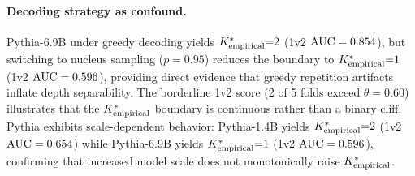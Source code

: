 \paragraph{Decoding strategy as confound.}
Pythia-6.9B under greedy decoding yields ${K^*_{\text{empirical}}}{=}2$ (1v2 $\text{AUC} = 0.854$), but switching to nucleus sampling ($p{=}0.95$) reduces the boundary to ${K^*_{\text{empirical}}}{=}1$ (1v2 $\text{AUC} = 0.596$), providing direct evidence that greedy repetition artifacts inflate depth separability.
The borderline 1v2 score (2 of 5 folds exceed $\theta{=}0.60$) illustrates that the ${K^*_{\text{empirical}}}$ boundary is continuous rather than a binary cliff.
Pythia exhibits scale-dependent behavior: Pythia-1.4B yields ${K^*_{\text{empirical}}}{=}2$ (1v2 $\text{AUC} = 0.654$) while Pythia-6.9B yields ${K^*_{\text{empirical}}}{=}1$ (1v2 $\text{AUC} = 0.596$), confirming that increased model scale does not monotonically raise ${K^*_{\text{empirical}}}$.

